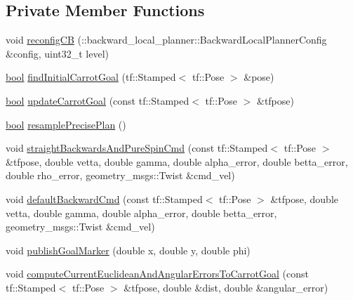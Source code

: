 \subsection*{Private Member Functions}
\begin{DoxyCompactItemize}
\item 
void \hyperlink{classcl__move__base__z_1_1backward__local__planner_1_1BackwardLocalPlanner_a62e4783adae03ce92190d855a021b91d}{reconfig\+CB} (\+::backward\+\_\+local\+\_\+planner\+::\+Backward\+Local\+Planner\+Config \&config, uint32\+\_\+t level)
\item 
\hyperlink{classbool}{bool} \hyperlink{classcl__move__base__z_1_1backward__local__planner_1_1BackwardLocalPlanner_a0025cd3ffaa04a6a02492a33673a78a1}{find\+Initial\+Carrot\+Goal} (tf\+::\+Stamped$<$ tf\+::\+Pose $>$ \&pose)
\item 
\hyperlink{classbool}{bool} \hyperlink{classcl__move__base__z_1_1backward__local__planner_1_1BackwardLocalPlanner_a16e79a1b4c0f18879f6f0a8ba67103fd}{update\+Carrot\+Goal} (const tf\+::\+Stamped$<$ tf\+::\+Pose $>$ \&tfpose)
\item 
\hyperlink{classbool}{bool} \hyperlink{classcl__move__base__z_1_1backward__local__planner_1_1BackwardLocalPlanner_a100fe8bdaaf89b0fa54ecf2aef0966ed}{resample\+Precise\+Plan} ()
\item 
void \hyperlink{classcl__move__base__z_1_1backward__local__planner_1_1BackwardLocalPlanner_a6069866b4a3150883de3212d8e43e8f8}{straight\+Backwards\+And\+Pure\+Spin\+Cmd} (const tf\+::\+Stamped$<$ tf\+::\+Pose $>$ \&tfpose, double vetta, double gamma, double alpha\+\_\+error, double betta\+\_\+error, double rho\+\_\+error, geometry\+\_\+msgs\+::\+Twist \&cmd\+\_\+vel)
\item 
void \hyperlink{classcl__move__base__z_1_1backward__local__planner_1_1BackwardLocalPlanner_a1ebd69a028a22e3573e98f89d593f97d}{default\+Backward\+Cmd} (const tf\+::\+Stamped$<$ tf\+::\+Pose $>$ \&tfpose, double vetta, double gamma, double alpha\+\_\+error, double betta\+\_\+error, geometry\+\_\+msgs\+::\+Twist \&cmd\+\_\+vel)
\item 
void \hyperlink{classcl__move__base__z_1_1backward__local__planner_1_1BackwardLocalPlanner_a70eaeb6cf31fd3378d9fbf9bcb975995}{publish\+Goal\+Marker} (double x, double y, double phi)
\item 
void \hyperlink{classcl__move__base__z_1_1backward__local__planner_1_1BackwardLocalPlanner_ad39ba029c760fc63ea286c74b5b9b795}{compute\+Current\+Euclidean\+And\+Angular\+Errors\+To\+Carrot\+Goal} (const tf\+::\+Stamped$<$ tf\+::\+Pose $>$ \&tfpose, double \&dist, double \&angular\+\_\+error)

\end{DoxyCompactItemize}
